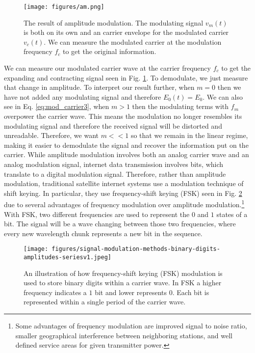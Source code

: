 \documentclass[10pt]{article}
\begin{document}
\begin{figure}[h!]
\centering
\texttt{[image: figures/am.png]}
\caption{The result of amplitude modulation. The modulating signal $v_m(t)$ is both on its own and an carrier envelope for the modulated carrier $v_c(t)$. We can measure the modulated carrier at the modulation frequency $f_c$ to get the original information\cite{dunlop2017telecommunications}.}
\label{fig:am}
\end{figure}

We can measure our modulated carrier wave at the carrier frequency $f_c$ to get the expanding and contracting signal seen in Fig. \ref{fig:am}. To demodulate, we just measure that change in amplitude. To interpret our result further, when $m = 0$ then we have not added any modulating signal and therefore $E_0(t) = E_0$. We can also see in Eq. \ref{eq:mod_carrier3}, when $m>1$ then the modulating terms with $f_m$ overpower the carrier wave. This means the modulation no longer resembles its modulating signal and therefore the received signal will be distorted and unreadable. Therefore, we want $m << 1$ so that we remain in the linear regime, making it easier to demodulate the signal and recover the information put on the carrier. While amplitude modulation involves both an analog carrier wave and an analog modulation signal, internet data transmission involves bits, which translate to a digital modulation signal. Therefore, rather than amplitude modulation, traditional satellite internet systems use a modulation technique of shift keying. In particular, they use frequency-shift keying (FSK) seen in Fig. \ref{fig:wave_modulation} due to several advantages of frequency modulation over amplitude modulation.\footnote{Some advantages of frequency modulation are improved signal to noise ratio, smaller geographical interference between neighboring stations, and well defined service areas for given transmitter power.} With FSK, two different frequencies are used to represent the $0$ and $1$ states of a bit. The signal will be a wave changing between those two frequencies, where every new wavelength chunk represents a new bit in the sequence.


\begin{figure}[h!]
\centering
\texttt{[image: figures/signal-modulation-methods-binary-digits-amplitudes-seriesv1.jpeg]}
\caption{An illustration of how frequency-shift keying (FSK) modulation is used to store binary digits within a carrier wave. In FSK a higher frequency indicates a $1$ bit and lower represents $0$. Each bit is represented within a single period of the carrier wave\cite{modulation_image}.}
\label{fig:wave_modulation}
\end{figure}
\end{document}

